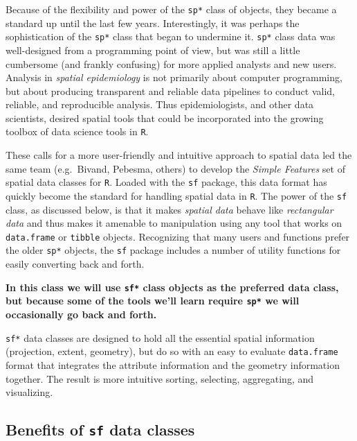\documentclass[
]{book}
\newcommand{\passthrough}[1]{#1}
\begin{document}
Because of the flexibility and power of the \passthrough{\lstinline!sp*!} class of objects, they became a standard up until the last few years. Interestingly, it was perhaps the sophistication of the \passthrough{\lstinline!sp*!} class that began to undermine it. \passthrough{\lstinline!sp*!} class data was well-designed from a programming point of view, but was still a little cumbersome (and frankly confusing) for more applied analysts and new users. Analysis in \emph{spatial epidemiology} is not primarily about computer programming, but about producing transparent and reliable data pipelines to conduct valid, reliable, and reproducible analysis. Thus epidemiologists, and other data scientists, desired spatial tools that could be incorporated into the growing toolbox of data science tools in \passthrough{\lstinline!R!}.

These calls for a more user-friendly and intuitive approach to spatial data led the same team (e.g.~Bivand, Pebesma, others) to develop the \emph{Simple Features} set of spatial data classes for \passthrough{\lstinline!R!}. Loaded with the \passthrough{\lstinline!sf!} package, this data format has quickly become the standard for handling spatial data in \passthrough{\lstinline!R!}. The power of the \passthrough{\lstinline!sf!} class, as discussed below, is that it makes \emph{spatial data} behave like \emph{rectangular data} and thus makes it amenable to manipulation using any tool that works on \passthrough{\lstinline!data.frame!} or \passthrough{\lstinline!tibble!} objects. Recognizing that many users and functions prefer the older \passthrough{\lstinline!sp*!} objects, the \passthrough{\lstinline!sf!} package includes a number of utility functions for easily converting back and forth.

\textbf{In this class we will use \passthrough{\lstinline!sf*!} class objects as the preferred data class, but because some of the tools we'll learn require \passthrough{\lstinline!sp*!} we will occasionally go back and forth.}

\passthrough{\lstinline!sf*!} data classes are designed to hold all the essential spatial information (projection, extent, geometry), but do so with an easy to evaluate \passthrough{\lstinline!data.frame!} format that integrates the attribute information and the geometry information together. The result is more intuitive sorting, selecting, aggregating, and visualizing.

\hypertarget{benefits-of-sf-data-classes}{%
\subsection{\texorpdfstring{Benefits of \texttt{sf} data classes}{Benefits of sf data classes}}\label{benefits-of-sf-data-classes}}
\end{document}

